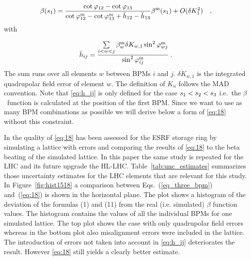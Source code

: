 \begin{equation}
\beta(s_1) = \frac{\cot\varphi_{12} - \cot\varphi_{13}}{\cot\varphi_{12}^\text{m} - \cot\varphi_{13}^\text{m} +\bar{h}_{12} - \bar{h}_{13}}\beta^\text{m}(s_1) + O(\delta K_1^2)\quad ,
\label{eq:18}
\end{equation}
with 

\begin{equation}
\bar{h}_{ij} =  \dfrac{\sum\limits_{i<w<j}\beta_w^\text{m}\delta K_{w,1}\sin^2\varphi_{wj}^\text{m}}{\sin^2\varphi_{ij}^\text{m}}\;.
\label{eq:h_ij}
\end{equation}
The sum runs over all elements $ w $ between BPMs $i$ and $j$. $\delta K_{w,1}$ is the integrated quadrupolar field error of element $w$. The definition of $ K_n $ follows the MAD \cite{madx} convention.
Note that \eqref{eq:h_ij} is only defined for the case $ s_1 <\nobreak s_2 < s_3 $ i.e.~the
$ \beta $~function is calculated at the position of the first BPM. Since we want to use as many BPM
combinations as possible we will derive below a form of \eqref{eq:18} without this constraint.

In \cite{Franchi:2016tfi} the quality of \eqref{eq:18} has been assessed for the ESRF storage ring by
simulating a lattice with errors and comparing the results of \eqref{eq:18} to the beta beating of
the simulated lattice. In this paper the same study is repeated for the LHC and its future upgrade the HL-LHC.
Table~\ref{tab:unc_estimates} summarizes those uncertainty estimates for the LHC elements that are
relevant for this study. 
In Figure~\ref{fig:hist1518} a comparison between Eqs.~(\ref{eq_three_bpm}) and~(\ref{eq:18}) is shown
in the horizontal plane. The plot shows a histogram of the deviation of the formulas (1) and (11)
from the real (i.e. simulated) $ \beta $ function values. The histogram contains the values of all the
individual BPMs for one simulated lattice. The top plot shows the case with only quadrupolar field
errors whereas in the bottom plot also misalignment errors were included in the lattice. The introduction
of errors not taken into account in \eqref{eq:h_ij} deteriorates the result. However \eqref{eq:18}
still yields a clearly better estimate.


